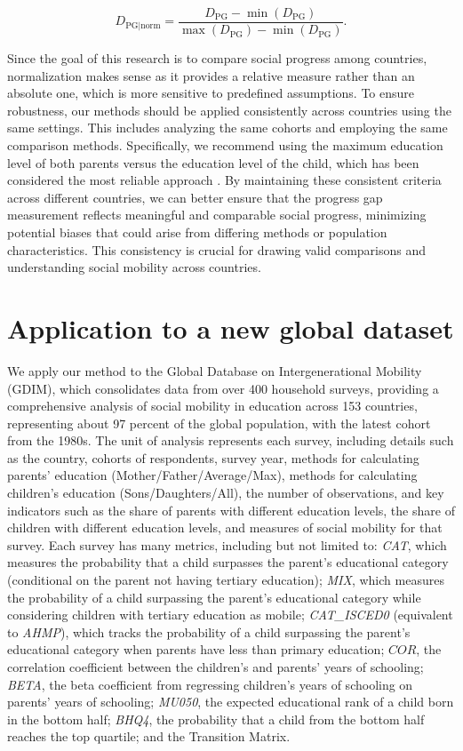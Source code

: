 \[
D_{\text{PG}|\text{norm}} = \frac{D_{\text{PG}} - \min(D_{\text{PG}})}{\max(D_{\text{PG}}) - \min(D_{\text{PG}})}.
\]

Since the goal of this research is to compare social progress among countries, normalization makes sense as it provides a relative measure rather than an absolute one, which is more sensitive to predefined assumptions. To ensure robustness, our methods should be applied consistently across countries using the same settings. This includes analyzing the same cohorts and employing the same comparison methods. Specifically, we recommend using the maximum education level of both parents versus the education level of the child, which has been considered the most reliable approach \citep{van2024intergenerational}. By maintaining these consistent criteria across different countries, we can better ensure that the progress gap measurement reflects meaningful and comparable social progress, minimizing potential biases that could arise from differing methods or population characteristics. This consistency is crucial for drawing valid comparisons and understanding social mobility across countries.

\section{Application to a new global dataset} \label{sec:application}


We apply our method to the Global Database on Intergenerational Mobility (GDIM), which consolidates data from over 400 household surveys, providing a comprehensive analysis of social mobility in education across 153 countries, representing about 97 percent of the global population, with the latest cohort from the 1980s. The unit of analysis represents each survey, including details such as the country, cohorts of respondents, survey year, methods for calculating parents' education (Mother/Father/Average/Max), methods for calculating children's education (Sons/Daughters/All), the number of observations, and key indicators such as the share of parents with different education levels, the share of children with different education levels, and measures of social mobility for that survey. Each survey has many metrics, including but not limited to: \textit{CAT}, which measures the probability that a child surpasses the parent’s educational category (conditional on the parent not having tertiary education); \textit{MIX}, which measures the probability of a child surpassing the parent’s educational category while considering children with tertiary education as mobile; \textit{CAT\_ISCED0} (equivalent to \textit{AHMP}), which tracks the probability of a child surpassing the parent’s educational category when parents have less than primary education; $COR$, the correlation coefficient between the children's and parents' years of schooling; \textit{BETA}, the beta coefficient from regressing children's years of schooling on parents' years of schooling; \textit{MU050}, the expected educational rank of a child born in the bottom half; \textit{BHQ4}, the probability that a child from the bottom half reaches the top quartile; and the Transition Matrix.


